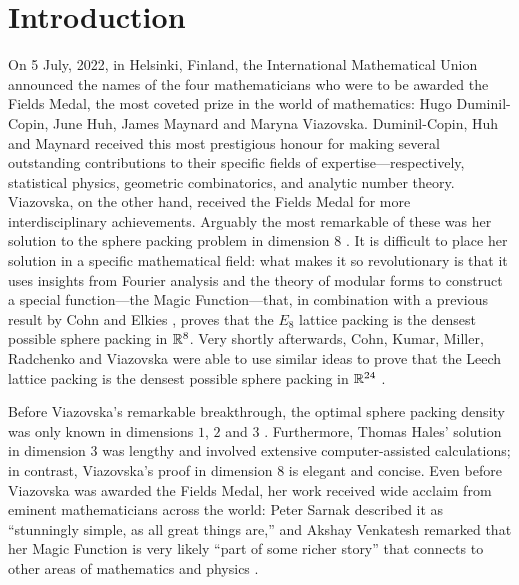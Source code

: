 \chapter{Introduction}
\thispagestyle{empty}

On 5 July, 2022, in Helsinki, Finland, the International Mathematical Union announced the names of the four mathematicians who were to be awarded the Fields Medal, the most coveted prize in the world of mathematics: Hugo Duminil-Copin, June Huh, James Maynard and Maryna Viazovska. Duminil-Copin, Huh and Maynard received this most prestigious honour for making several outstanding contributions to their specific fields of expertise---respectively, statistical physics, geometric combinatorics, and analytic number theory. Viazovska, on the other hand, received the Fields Medal for more interdisciplinary achievements. Arguably the most remarkable of these was her solution to the sphere packing problem in dimension 8 \cite{Viazovska8}. It is difficult to place her solution in a specific mathematical field: what makes it so revolutionary is that it uses insights from Fourier analysis and the theory of modular forms to construct a special function---the Magic Function---that, in combination with a previous result by Cohn and Elkies \cite{CohnElkies}, proves that the $E_8$ lattice packing is the densest possible sphere packing in $\mathbb{R}^8$. Very shortly afterwards, Cohn, Kumar, Miller, Radchenko and Viazovska were able to use similar ideas to prove that the Leech lattice packing is the densest possible sphere packing in $\mathbb{R}^{24}$ \cite{Viazovska24}.

Before Viazovska's remarkable breakthrough, the optimal sphere packing density was only known in dimensions $1$, $2$ and $3$ \cite{CohnOnViazovska}. Furthermore, Thomas Hales' solution in dimension $3$ \cite{HalesKeplerInformal} was lengthy and involved extensive computer-assisted calculations; in contrast, Viazovska's proof in dimension $8$ is elegant and concise. Even before Viazovska was awarded the Fields Medal, her work received wide acclaim from eminent mathematicians across the world: Peter Sarnak described it as ``stunningly simple, as all great things are,'' and Akshay Venkatesh remarked that her Magic Function is very likely ``part of some richer story'' that connects to other areas of mathematics and physics \cite{QuantaPiece}.






